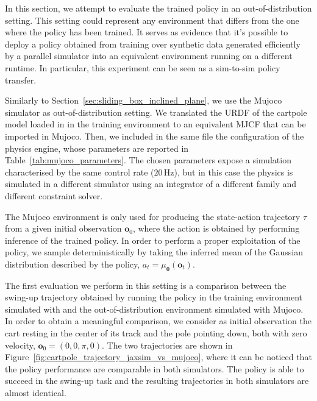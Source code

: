 In this section, we attempt to evaluate the trained policy in an out-of-distribution setting.
This setting could represent any environment that differs from the one where the policy has been trained.
It serves as evidence that it's possible to deploy a policy obtained from training over synthetic data generated efficiently by a parallel simulator into an equivalent environment running on a different runtime.
In particular, this experiment can be seen as a sim-to-sim policy transfer.

Similarly to Section~\ref{sec:sliding_box_inclined_plane}, we use the Mujoco simulator as out-of-distribution setting.
We translated the \ac{URDF} of the cartpole model loaded in \jaxsim in the training environment to an equivalent \ac{MJCF} that can be imported in Mujoco.
Then, we included in the same file the configuration of the physics engine, whose parameters are reported in Table~\ref{tab:mujoco_parameters}.
The chosen parameters expose a simulation characterised by the same control rate ($20\,$Hz), but in this case the physics is simulated in a different simulator using an integrator of a different family and different constraint solver.

The Mujoco environment is only used for producing the state-action trajectory $\tau$ from a given initial observation $\mathbf{o}_0$, where the action is obtained by performing inference of the trained policy.
In order to perform a proper exploitation of the policy, we sample deterministically by taking the inferred mean of the Gaussian distribution described by the policy, \ie $a_t = \mu_{\boldsymbol{\theta}}(\mathbf{o}_t)$.

The first evaluation we perform in this setting is a comparison between the swing-up trajectory obtained by running the policy in the training environment simulated with \jaxsim and the out-of-distribution environment simulated with Mujoco.
In order to obtain a meaningful comparison, we consider as initial observation the cart resting in the center of its track and the pole pointing down, both with zero velocity, \ie $\mathbf{o}_0 = (0, 0, \pi, 0)$.
The two trajectories are shown in Figure~\ref{fig:cartpole_trajectory_jaxsim_vs_mujoco}, where it can be noticed that the policy performance are comparable in both simulators.
The policy is able to succeed in the swing-up task and the resulting trajectories in both simulators are almost identical.

